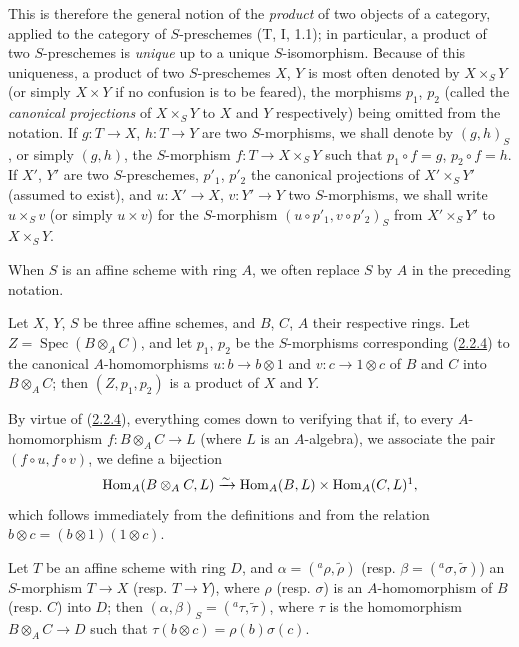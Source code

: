 This is therefore the general notion of the \emph{product} of two objects of a
category, applied to the category of $S$-preschemes (T, I, 1.1); in
particular, a product of two $S$-preschemes is \emph{unique} up to a unique
$S$-isomorphism. Because of this uniqueness, a product of two $S$-preschemes
$X$, $Y$ is most often denoted by
$X\times_S Y$ (or simply $X\times Y$ if no confusion is to be feared),
the morphisms $p_1$, $p_2$ (called the \emph{canonical projections} of
$X\times_S Y$ to $X$ and $Y$ respectively) being omitted from the notation.
If $g:T\to X$, $h:T\to Y$ are two $S$-morphisms, we shall denote by
$(g,h)_S$, or simply $(g,h)$, the $S$-morphism
$f:T\to X\times_S Y$ such that $p_1\circ f=g$, $p_2\circ f=h$. If $X'$, $Y'$
are two $S$-preschemes, $p'_1$, $p'_2$ the canonical projections of
$X'\times_S Y'$ (assumed to exist), and $u:X'\to X$, $v:Y'\to Y$ two
$S$-morphisms, we shall write $u\times_S v$ (or simply $u\times v$) for the
$S$-morphism $(u\circ p'_1,v\circ p'_2)_S$ from $X'\times_S Y'$ to
$X\times_S Y$.

When $S$ is an affine scheme with ring $A$, we often replace $S$ by $A$
in the preceding notation.

\begin{proposition}[3.2.2]
\label{I.3.2.2}
Let $X$, $Y$, $S$ be three affine schemes, and $B$, $C$, $A$ their respective
rings. Let $Z=\operatorname{Spec}(B\otimes_A C)$, and let $p_1$, $p_2$ be the
$S$-morphisms corresponding \textup{(\hyperref[I.2.2.4]{2.2.4})} to the
canonical $A$-homomorphisms $u:b\to b\otimes1$ and
$v:c\to1\otimes c$ of $B$ and $C$ into $B\otimes_A C$; then
$(Z,p_1,p_2)$ is a product of $X$ and $Y$.
\end{proposition}

By virtue of (\hyperref[I.2.2.4]{2.2.4}), everything comes down to verifying
that if, to every $A$-homomorphism $f:B\otimes_A C\to L$ (where $L$ is an
$A$-algebra), we associate the pair $(f\circ u,f\circ v)$, we define a bijection
\[
  \operatorname{Hom}_A(B\otimes_A C,L)\xrightarrow{\sim}
  \operatorname{Hom}_A(B,L)\times\operatorname{Hom}_A(C,L)\footnotemark,
\]
 which follows immediately from the definitions
and from the relation $b\otimes c=(b\otimes1)(1\otimes c)$.

\begin{corollary}[3.2.3]
\label{I.3.2.3}
Let $T$ be an affine scheme with ring $D$, and
$\alpha=({}^a\rho,\widetilde{\rho})$
\textup{(resp. $\beta=({}^a\sigma,\widetilde{\sigma})$)} an $S$-morphism $T\to X$
\textup{(resp. $T\to Y$)}, where $\rho$ \textup{(resp. $\sigma$)} is an $A$-homomorphism of $B$
\textup{(resp. $C$)} into $D$; then
$(\alpha,\beta)_S=({}^a\tau,\widetilde{\tau})$, where $\tau$ is the homomorphism
$B\otimes_A C\to D$ such that $\tau(b\otimes c)=\rho(b)\sigma(c)$.
\end{corollary}

